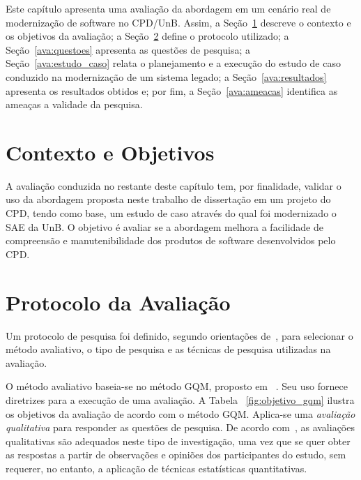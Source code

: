 \label{avaliacao}

Este capítulo apresenta uma avaliação da abordagem em um cenário real
de modernização de software no CPD/UnB. Assim, a Seção~\ref{ava:contexto} descreve
o contexto e os objetivos da avaliação; a Seção~\ref{ava:protocolo} define
o protocolo utilizado; a Seção~\ref{ava:questoes} apresenta as questões de
pesquisa; a Seção~\ref{ava:estudo_caso} relata o planejamento e a execução
do estudo de caso conduzido na modernização de um sistema legado; 
a Seção~\ref{ava:resultados} apresenta os resultados obtidos e; por fim,
a Seção~\ref{ava:ameacas} identifica as ameaças a validade da pesquisa.

\section{Contexto e Objetivos}\label{ava:contexto}

A avaliação conduzida no restante deste capítulo tem, por finalidade, validar
o uso da abordagem proposta neste trabalho de dissertação em um projeto do CPD, 
tendo como base, um estudo de caso através do qual foi modernizado o \acrfull{SAE} 
da \acrlong{UnB}. O objetivo é avaliar se a abordagem melhora a facilidade de 
compreensão e manutenibilidade dos produtos de software desenvolvidos pelo CPD. 




\section{Protocolo da Avaliação}\label{ava:protocolo}

Um protocolo de pesquisa foi definido, segundo
orientações de~\cite{Petersen:2008}, 
para selecionar o método avaliativo, o tipo de pesquisa e
as técnicas de pesquisa utilizadas na avaliação.

O método avaliativo baseia-se no método \acrfull{GQM}, 
proposto em ~\cite{van1999goal}. Seu 
uso fornece diretrizes para a execução de uma avaliação. A 
Tabela ~\ref{fig:objetivo_gqm} 
ilustra os objetivos da avaliação de acordo com o
método \acrshort{GQM}. Aplica-se uma \emph{avaliação qualitativa}
para responder as questões de pesquisa. De 
acordo com~\cite{iso2003iec}, as avaliações qualitativas
são adequados neste tipo de investigação, uma vez que se
quer obter as respostas a partir de 
observações e opiniões dos participantes do estudo,
sem requerer, no entanto, 
a aplicação de técnicas estatísticas quantitativas. 



